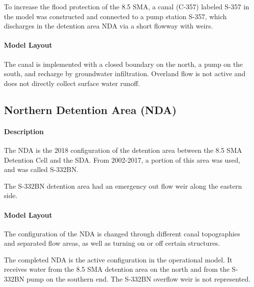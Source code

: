 To increase the flood protection of the 8.5 SMA, a canal (C-357) labeled S-357 in the model was constructed and connected to a pump station S-357, which discharges in the detention area NDA via a short flowway with weirs.


\paragraph{Model Layout}
The canal is implemented with a closed boundary on the north, a pump on the south, and recharge by groundwater infiltration. Overland flow is not active and does not directly collect surface water runoff.




\clearpage
\subsection{Northern Detention Area (NDA)}



\paragraph{Description}
The NDA is the 2018 configuration of the detention area between the 8.5 SMA Detention Cell and the SDA. From 2002-2017, a portion of this area was used, and was called S-332BN.

The S-332BN detention area had an emergency out flow weir along the eastern side.

\paragraph{Model Layout}

The configuration of the NDA is changed through different canal topographies and separated flow areas, as well as turning on or off certain structures.

The completed NDA is the active configuration in the operational model. It receives water from the 8.5 SMA detention area on the north and from the S-332BN pump on the southern end. The S-332BN overflow weir is not represented.



